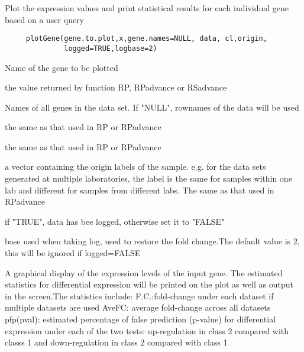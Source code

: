 \begin{Description}\relax
Plot the expression values and print statistical results 
for each individual gene based on a user query
\end{Description}
\begin{Usage}
\begin{verbatim}
     plotGene(gene.to.plot,x,gene.names=NULL, data, cl,origin,
              logged=TRUE,logbase=2)\end{verbatim}
\end{Usage}
\begin{Arguments}
\begin{ldescription}
\item[\code{gene.to.plot}] Name of the gene to be plotted
\item[\code{x}] the value returned by function RP, 
RPadvance or RSadvance 
\item[\code{gene.names}] Names of all genes in the data set. If "NULL", rownames 
of the data will be used
\item[\code{data}] the same as that used in RP or RPadvance
\item[\code{cl}] the same as that used in RP or RPadvance
\item[\code{origin}] a vector containing the origin labels of the 
sample. e.g. for 
the data sets generated at multiple laboratories, the label
is the same for samples within one lab and different for samples 
from different labs. The same as that used in RPadvance
\item[\code{logged}] if "TRUE", data has bee logged, otherwise set it 
to "FALSE"
\item[\code{logbase}] base used when taking log, used to restore the 
fold change.The default value is 2, this will be 
ignored if logged=FALSE
\end{ldescription}
\end{Arguments}
\begin{Value}
A graphical display of the expression levels of the input gene. 
The estimated statistics for differential expression will be printed 
on the plot as well as output in the screen.The statistics include: 
F.C.:fold-change under each dataset if multiple datasets are used
AveFC: average fold-change across all datasets
pfp(pval): estimated percentage of false prediction (p-value) for 
differential expression under each of the two tests: up-regulation 
in class 2 compared with classs 1 and down-regulation in class 2 
compared with class 1
\end{Value}
